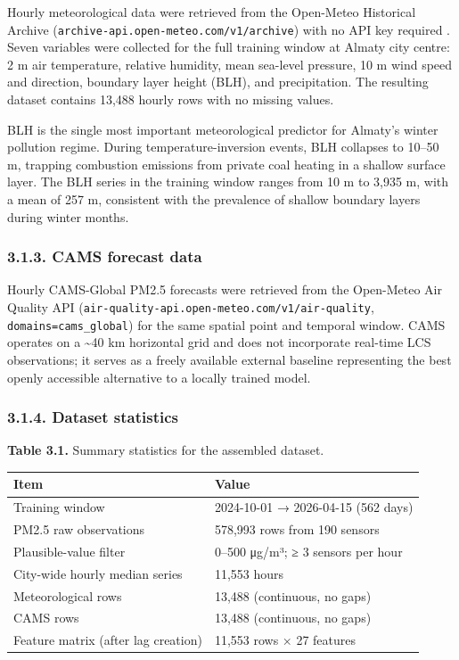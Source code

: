 Hourly meteorological data were retrieved from the Open-Meteo Historical Archive (\texttt{archive-api.open-meteo.com/v1/archive}) with no API key required \cite{zippenfenig_openmeteo_2023}. Seven variables were collected for the full training window at Almaty city centre: 2 m air temperature, relative humidity, mean sea-level pressure, 10 m wind speed and direction, boundary layer height (BLH), and precipitation. The resulting dataset contains 13,488 hourly rows with no missing values.

BLH is the single most important meteorological predictor for Almaty's winter pollution regime. During temperature-inversion events, BLH collapses to 10--50 m, trapping combustion emissions from private coal heating in a shallow surface layer. The BLH series in the training window ranges from 10 m to 3,935 m, with a mean of 257 m, consistent with the prevalence of shallow boundary layers during winter months.

\subsubsection{3.1.3. CAMS forecast data}\label{cams-forecast-data}

Hourly CAMS-Global PM2.5 forecasts were retrieved from the Open-Meteo Air Quality API (\texttt{air-quality-api.open-meteo.com/v1/air-quality}, \texttt{domains=cams\_global}) for the same spatial point and temporal window. CAMS operates on a \textasciitilde40 km horizontal grid and does not incorporate real-time LCS observations; it serves as a freely available external baseline representing the best openly accessible alternative to a locally trained model.

\subsubsection{3.1.4. Dataset statistics}\label{dataset-statistics}

\textbf{Table 3.1.} Summary statistics for the assembled dataset.

\begin{longtable}[]{@{}ll@{}}
\toprule\noalign{}
Item & Value \\
\midrule\noalign{}
\endhead
\bottomrule\noalign{}
\endlastfoot
Training window & 2024-10-01 → 2026-04-15 (562 days) \\
PM2.5 raw observations & 578,993 rows from 190 sensors \\
Plausible-value filter & 0--500 μg/m³; ≥ 3 sensors per hour \\
City-wide hourly median series & 11,553 hours \\
Meteorological rows & 13,488 (continuous, no gaps) \\
CAMS rows & 13,488 (continuous, no gaps) \\
Feature matrix (after lag creation) & 11,553 rows × 27 features \\
\end{longtable}


